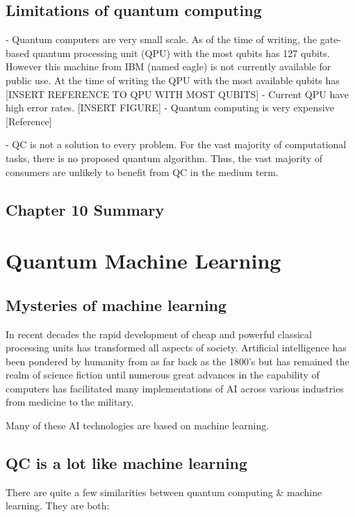 \documentclass{book}
\begin{document}
\section{Limitations of quantum computing}

- Quantum computers are very small scale. As of the time of writing, the gate-based quantum processing unit (QPU) with the most qubits has 127 qubits. However this machine from IBM (named eagle) is not currently available for public use. At the time of writing the QPU with the most available qubits has [INSERT REFERENCE TO QPU WITH MOST QUBITS]
- Current QPU have high error rates. [INSERT FIGURE]
- Quantum computing is very expensive [Reference]

- QC is not a solution to every problem. For the vast majority of computational tasks, there is no proposed quantum algorithm. Thus, the vast majority of consumers are unlikely to benefit from QC in the medium term.


\section{Chapter 10 Summary}


\chapter{Quantum Machine Learning}

\section{Mysteries of machine learning}


In recent decades the rapid development of cheap and powerful classical processing units has transformed all aspects of society. Artificial intelligence has been pondered by humanity from as far back as the 1800's but has remained the realm of science fiction until numerous great advances in the capability of computers has facilitated many implementations of AI across various industries from medicine to the military. 

Many of these AI technologies are based on machine learning. 

\section{QC is a lot like machine learning}

There are quite a few similarities between quantum computing \& machine learning. They are both:
\end{document}
